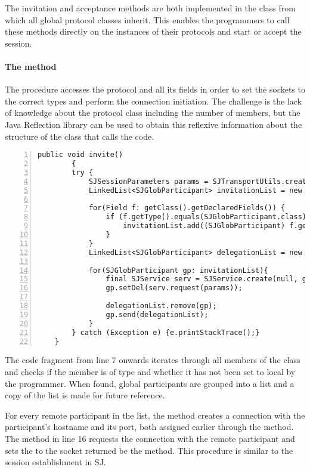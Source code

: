 The invitation and acceptance methods are both implemented in the  class from which all global protocol classes inherit. This enables the programmers to call these methods directly on the instances of their protocols and start or accept the session.

\paragraph*{The  method} The procedure accesses the protocol and all its  fields in order to set the sockets to the correct types and perform the connection initiation. The challenge is the lack of knowledge about the protocol class including the number of  members, but the Java Reflection library\cite{javareflect} can be used to obtain this reflexive information about the structure of the class that calls the code. 

\begin{lstlisting}[basicstyle=\LISTINGSTYLE, numbers=left, caption=The session initiation method]
	public void invite() 
		{
		try {
			SJSessionParameters params = SJTransportUtils.createSJSessionParameters("d", "d");
			LinkedList<SJGlobParticipant> invitationList = new LinkedList<SJGlobParticipant>();
		
			for(Field f: getClass().getDeclaredFields()) {		
				if (f.getType().equals(SJGlobParticipant.class) && (!((SJGlobParticipant) f.get(this)).isLocal())) {		
					invitationList.add((SJGlobParticipant) f.get(this));			
				}
			}
			LinkedList<SJGlobParticipant> delegationList = new LinkedList<SJGlobParticipant>(invitationList);
		
			for(SJGlobParticipant gp: invitationList){			
				final SJService serv = SJService.create(null, gp.getHostname(), gp.getRemPort());
				gp.setDel(serv.request(params));
					
				delegationList.remove(gp);
				gp.send(delegationList);
			}
		} catch (Exception e) {e.printStackTrace();} 
	}
\end{lstlisting}

The code fragment from line 7 onwards iterates through all members of the class and checks if the member is of type  and whether it has not been set to local by the programmer. When found, global participants are grouped into a list and a copy of the list is made for future reference.

For every remote participant in the list, the  method creates a connection with the participant's hostname and its port, both assigned earlier through the  method. The method  in line 16 requests the connection with the remote participant and sets the  to the socket returned be the  method. This procedure is similar to the session establishment in SJ.

